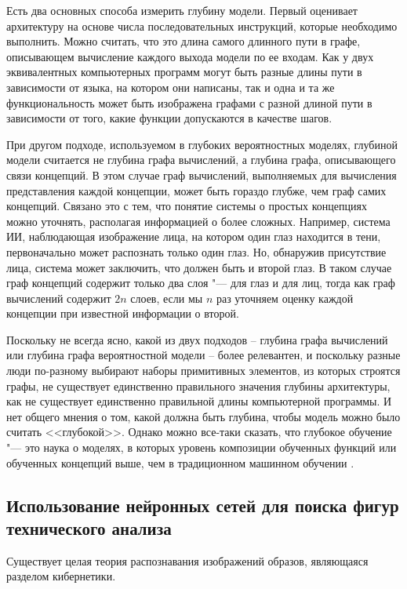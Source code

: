 \documentclass[bachelor, och, coursework]{SCWorks}
\begin{document}
        Есть два основных способа измерить глубину модели. Первый оценивает
        архитектуру на основе числа последовательных инструкций, которые
        необходимо выполнить. Можно считать, что это длина самого длинного пути
        в графе, описывающем вычисление каждого выхода модели по ее входам. Как
        у двух эквивалентных компьютерных программ могут быть разные длины пути
        в зависимости от языка, на котором они написаны, так и одна и та же
        функциональность может быть изображена графами с разной длиной пути в
        зависимости от того, какие функции допускаются в качестве шагов. 

        При другом подходе, используемом в глубоких вероятностных моделях,
        глубиной модели считается не глубина графа вычислений, а глубина графа,
        описывающего связи концепций. В этом случае граф вычислений, выполняемых
        для вычисления представления каждой концепции, может быть гораздо
        глубже, чем граф самих концепций. Связано это с тем, что понятие системы
        о простых концепциях можно уточнять, располагая информацией о более
        сложных. Например, система ИИ, наблюдающая изображение лица, на котором
        один глаз находится в тени, первоначально может распознать только один
        глаз. Но, обнаружив присутствие лица, система может заключить, что
        должен быть и второй глаз. В таком случае граф концепций содержит только
        два слоя "--- для глаз и для лиц, тогда как граф вычислений содержит
        $2n$ слоев, если мы $n$ раз уточняем оценку каждой концепции при
        известной информации о второй.

        Поскольку не всегда ясно, какой из двух подходов – глубина графа
        вычислений или глубина графа вероятностной модели – более релевантен, и
        поскольку разные люди по-разному выбирают наборы примитивных элементов,
        из которых строятся графы, не существует единственно правильного
        значения глубины архитектуры, как не существует единственно правильной
        длины компьютерной программы. И нет общего мнения о том, какой должна
        быть глубина, чтобы модель можно было считать <<глубокой>>. Однако можно
        все-таки сказать, что глубокое обучение "--- это наука о моделях, в
        которых уровень композиции обученных функций или обученных концепций
        выше, чем в традиционном машинном обучении \cite{GF}.

        \subsection{Использование нейронных сетей для поиска фигур технического анализа}
        Существует целая теория распознавания изображений образов, являющаяся
        разделом кибернетики.
\end{document}
